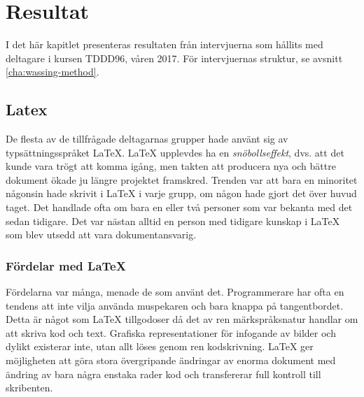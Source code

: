 
\chapter{Resultat}
\label{cha:wassing-results}
I det här kapitlet presenteras resultaten från intervjuerna som hållits med deltagare i kursen TDDD96, våren 2017. För intervjuernas struktur, se avsnitt \ref{cha:wassing-method}.

\section{Latex}
\label{sec:wassing-latex}
De flesta av de tillfrågade deltagarnas grupper hade använt sig av typsättningsspråket LaTeX. LaTeX upplevdes ha en \textit{snöbollseffekt}, dvs. att det kunde vara trögt att komma igång, men takten att producera nya och bättre dokument ökade ju längre projektet framskred. Trenden var att bara en minoritet någonsin hade skrivit i LaTeX i varje grupp, om någon hade gjort det över huvud taget. Det handlade ofta om bara en eller två personer som var bekanta med det sedan tidigare. Det var nästan alltid en person med tidigare kunskap i LaTeX som blev utsedd att vara dokumentansvarig.

\subsection{Fördelar med LaTeX}
Fördelarna var många, menade de som använt det. Programmerare har ofta en tendens att inte vilja använda muspekaren och bara knappa på tangentbordet. Detta är något som LaTeX tillgodoser då det av ren märkspråksnatur handlar om att skriva kod och text. Grafiska representationer för infogande av bilder och dylikt existerar inte, utan allt löses genom ren kodskrivning. LaTeX ger möjligheten att göra stora övergripande ändringar av enorma dokument med ändring av bara några enstaka rader kod och transfererar full kontroll till skribenten.

